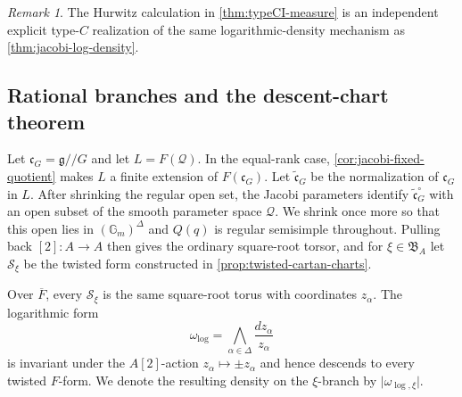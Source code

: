 \documentclass[11pt]{amsart}
\theoremstyle{definition}
\theoremstyle{remark}
\newtheorem{remark}[remark]{Remark}
\newcommand{\Fb}{\overline F}
\newcommand{\cQ}{\mathcal Q}
\newcommand{\cS}{\mathcal S}
\newcommand{\Gm}{\mathbb G_m}
\newcommand{\cC}{\mathfrak c}
\newcommand{\abs}[1]{\lvert #1\rvert}
\newcommand{\g}{\mathfrak g}
\begin{document}
\begin{remark}
The Hurwitz calculation in \cref{thm:typeCI-measure} is an independent
explicit type-$C$ realization of the same logarithmic-density mechanism as
\cref{thm:jacobi-log-density}.
\end{remark}

\subsection{Rational branches and the descent-chart theorem}

Let $\cC_G=\g/\!/G$ and let $L=F(\cQ)$.  In the equal-rank case,
\cref{cor:jacobi-fixed-quotient} makes $L$ a finite extension of
$F(\cC_G)$.  Let $\widetilde{\cC}_G$ be the normalization of $\cC_G$ in
$L$.  After shrinking the regular open set, the Jacobi parameters identify
$\widetilde{\cC}_G^\circ$ with an open subset of the smooth parameter space
$\cQ$.  We shrink once more so that this open lies in $(\Gm)^\Delta$ and
$Q(q)$ is regular semisimple throughout.  Pulling back $[2]:A\to A$ then
gives the ordinary square-root torsor, and
for $\xi\in\mathfrak B_A$ let $\cS_\xi$ be the twisted form constructed in
\cref{prop:twisted-cartan-charts}.

Over $\Fb$, every $\cS_\xi$ is the same square-root torus with coordinates
$z_\alpha$.  The logarithmic form
\begin{equation}\label{eq:log-form}
 \omega_{\log}=\bigwedge_{\alpha\in\Delta}\frac{dz_\alpha}{z_\alpha}
\end{equation}
is invariant under the $A[2]$-action $z_\alpha\mapsto\pm z_\alpha$ and hence
descends to every twisted $F$-form.  We denote the resulting density on the
$\xi$-branch by $\abs{\omega_{\log,\xi}}$.
\end{document}
